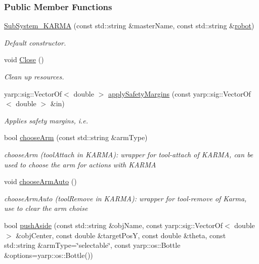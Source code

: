 \subsubsection*{Public Member Functions}
\begin{DoxyCompactItemize}
\item 
\hyperlink{group__icubclient__subsystems_aaefefc860c78c126fadf0e5a33978ca5}{Sub\+System\+\_\+\+K\+A\+R\+MA} (const std\+::string \&master\+Name, const std\+::string \&\hyperlink{group__icubclient__subsystems_aeeeaf8af66dcee9d7c1173528bc30d7a}{robot})
\begin{DoxyCompactList}\small\item\em Default constructor. \end{DoxyCompactList}\item 
void \hyperlink{group__icubclient__subsystems_acdec5cffb610e7b93d2d51ac22765b21}{Close} ()
\begin{DoxyCompactList}\small\item\em Clean up resources. \end{DoxyCompactList}\item 
yarp\+::sig\+::\+Vector\+Of$<$ double $>$ \hyperlink{group__icubclient__subsystems_abc4835144a2474b400777fd4045b6045}{apply\+Safety\+Margins} (const yarp\+::sig\+::\+Vector\+Of$<$ double $>$ \&in)
\begin{DoxyCompactList}\small\item\em Applies safety margins, i.\+e. \end{DoxyCompactList}\item 
bool \hyperlink{group__icubclient__subsystems_a657a8377ba54195005a55811f530f990}{choose\+Arm} (const std\+::string \&arm\+Type)
\begin{DoxyCompactList}\small\item\em choose\+Arm (tool\+Attach in K\+A\+R\+MA)\+: wrapper for tool-\/attach of K\+A\+R\+MA, can be used to choose the arm for actions with K\+A\+R\+MA \end{DoxyCompactList}\item 
void \hyperlink{group__icubclient__subsystems_a90f064b10e6953a42e58b3b623893551}{choose\+Arm\+Auto} ()
\begin{DoxyCompactList}\small\item\em choose\+Arm\+Auto (tool\+Remove in K\+A\+R\+MA)\+: wrapper for tool-\/remove of Karma, use to clear the arm choise \end{DoxyCompactList}\item 
bool \hyperlink{group__icubclient__subsystems_ae831bfd7af1572a65f53b11b9519e473}{push\+Aside} (const std\+::string \&obj\+Name, const yarp\+::sig\+::\+Vector\+Of$<$ double $>$ \&obj\+Center, const double \&target\+PosY, const double \&theta, const std\+::string \&arm\+Type=\char`\"{}selectable\char`\"{}, const yarp\+::os\+::\+Bottle \&options=yarp\+::os\+::\+Bottle())

\end{DoxyCompactItemize}

